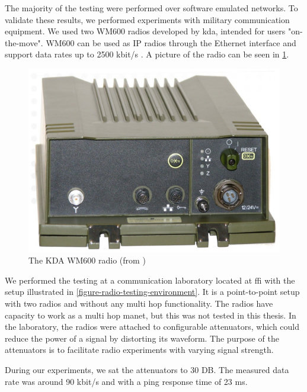 The majority of the testing were performed over software emulated networks. To
validate these results, we performed experiments with military communication
equipment. We used two WM600 radios developed by \gls{kda}, intended for users
"on-the-move". WM600 can be used as IP radios through the Ethernet interface and
support data rates up to 2500 kbit/s \cite{kongsberg-wm600}. A picture of the
radio can be seen in \cref{figure-kdawm600}.

\begin{figure}[h]
\centering
\includegraphics[scale=0.2]{images/kda_wm600.jpg}
\caption{The KDA WM600 radio (from \cite{kongsberg-wm600})}
\label{figure-kdawm600}
\end{figure}

We performed the testing at a communication laboratory located at \gls{ffi} with
the setup illustrated in \cref{figure-radio-testing-environment}. It is a
point-to-point setup with two radios and without any multi hop functionality.
The radios have capacity to work as a multi hop \gls{manet}, but this was not
tested in this thesis. In the laboratory, the radios were attached to
configurable attenuators, which could reduce the power of a signal by distorting
its waveform. The purpose of the attenuators is to facilitate radio experiments
with varying signal strength.

During our experiments, we sat the attenuators to 30 DB. The measured data rate
was around 90 kbit/s and with a ping response time of 23 ms.

